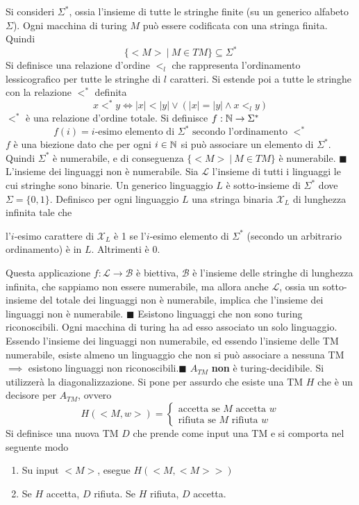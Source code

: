 \documentclass[10pt, letterpaper]{report}
\begin{document}
 Si consideri $\Sigma^*$, ossia l'insieme di tutte le stringhe finite (su un generico alfabeto $\Sigma$). Ogni macchina di turing $M$ può essere codificata con una stringa finita. Quindi 
$$ \{<M>\ |\ M\in TM\}\subseteq \Sigma^*$$
Si definisce una relazione d'ordine $<_l$ che rappresenta l'ordinamento lessicografico per tutte le 
stringhe di $l$ caratteri. Si estende poi  a tutte le stringhe con la relazione $<^*$ definita 
$$ x<^*y\iff 
    |x|<|y| \lor (|x|=|y|\land x<_l y)
$$
$<^*$ è una relazione d'ordine totale. Si definisce $f:{\mathbb N}\rightarrow \Sigma^*$ 
$$ f(i)=i\text{-esimo elemento di $\Sigma^*$ secondo l'ordinamento }<^*$$
$f$ è una biezione dato che per ogni $i\in{\mathbb N}$ si può associare un elemento di $\Sigma^*$. Quindi $\Sigma^*$ è numerabile, e di conseguenza $\{<M>\ |\ M\in TM\}$ è numerabile. \hfill$\blacksquare$\acc 
{} L'insieme dei linguaggi non è numerabile.\acc 
{} Sia $\mathcal{L}$ l'insieme di tutti i linguaggi le cui stringhe sono binarie. Un generico linguaggio $L$ è sotto-insieme di $\Sigma^*$ dove $\Sigma=\{0,1\}$. 
Definisco per ogni linguaggio $L$ una stringa binaria $\mathcal{X}_L$ di lunghezza infinita tale che 
\begin{center}
    l'$i$-esimo carattere di $\mathcal{X}_L$ è 1 se l'$i$-esimo elemento di $\Sigma^*$ (secondo un arbitrario ordinamento) è in $L$. Altrimenti è 0. 
\end{center}
Questa applicazione $f:\mathcal{L}\rightarrow\mathcal{B}$ è biettiva, $\mathcal{B}$ è l'insieme delle stringhe di lunghezza infinita, che sappiamo non essere numerabile, ma allora anche $\mathcal{L}$, ossia un sotto-insieme del totale dei linguaggi non è numerabile, implica che l'insieme dei linguaggi non è numerabile. \hfill$\blacksquare$\acc 
{} Esistono linguaggi che non sono turing riconoscibili. \acc 
\dimo{} Ogni macchina di turing ha ad esso associato un solo linguaggio. Essendo l'insieme dei linguaggi non numerabile, ed essendo l'insieme delle TM numerabile, esiste almeno un linguaggio che non si può associare a nessuna TM $\implies$ esistono linguaggi non riconoscibili.\hfill$\blacksquare$\acc 
\teo{} $A_{TM}$ \textbf{non} è turing-decidibile.\acc 
\dimo{} Si utilizzerà la diagonalizzazione. Si pone per assurdo che esiste una TM $H$ che è un decisore per $A_{TM}$, ovvero 
$$ H(<M,w>)=\begin{cases}
    \text{accetta se $M$ accetta $w$}\\ 
    \text{rifiuta se $M$ rifiuta $w$}
\end{cases}$$
Si definisce una nuova TM $D$ che prende come input una TM e si comporta nel seguente modo \begin{enumerate}
    \item Su input $<M>$, esegue $H(<M,<M>>)$
    \item Se $H$ accetta, $D$ rifiuta. Se $H$ rifiuta, $D$ accetta.
\end{enumerate}
\end{document}
